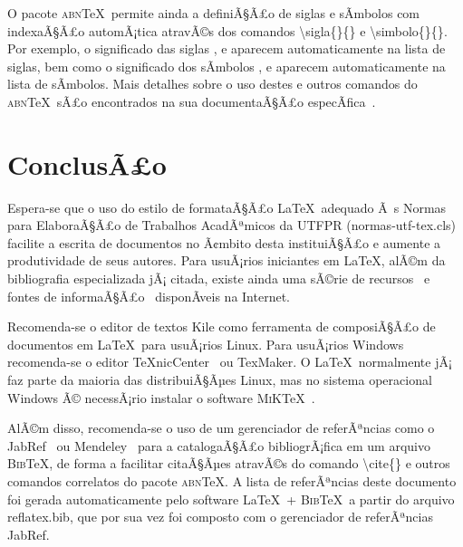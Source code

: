 \documentclass[openright]{normas-utf-tex} %
\begin{document}
O pacote \textsc{abn}\TeX\ permite ainda a definiÃ§Ã£o de siglas e sÃ­mbolos com indexaÃ§Ã£o automÃ¡tica atravÃ©s dos comandos {\ttfamily \textbackslash sigla\{\}\{\}} e {\ttfamily \textbackslash simbolo\{\}\{\}}. Por exemplo, o significado das siglas ,  e  aparecem automaticamente na lista de siglas, bem como o significado dos sÃ­mbolos ,  e  aparecem automaticamente na lista de sÃ­mbolos. Mais detalhes sobre o uso destes e outros comandos do \textsc{abn}\TeX\ sÃ£o encontrados na sua documentaÃ§Ã£o especÃ­fica~\cite{abnTeX2009}.


\chapter{ConclusÃ£o}
\label{chap:conclusao}

Espera-se que o uso do estilo de formataÃ§Ã£o \LaTeX\ adequado Ã s Normas para ElaboraÃ§Ã£o de Trabalhos AcadÃªmicos da UTFPR ({\ttfamily normas-utf-tex.cls}) facilite a escrita de documentos no Ã¢mbito desta instituiÃ§Ã£o e aumente a produtividade de seus autores. Para usuÃ¡rios iniciantes em \LaTeX, alÃ©m da bibliografia especializada jÃ¡ citada, existe ainda uma sÃ©rie de recursos~\cite{CTAN2009} e fontes de informaÃ§Ã£o~\cite{TeX-Br2009,Wikibooks2009} disponÃ­veis na Internet.

Recomenda-se o editor de textos Kile como ferramenta de composiÃ§Ã£o de documentos em \LaTeX\ para usuÃ¡rios Linux. Para usuÃ¡rios Windows recomenda-se o editor \TeX nicCenter~\cite{TeXnicCenter2009} ou TexMaker. O \LaTeX\ normalmente jÃ¡ faz parte da maioria das distribuiÃ§Ãµes Linux, mas no sistema operacional Windows Ã© necessÃ¡rio instalar o software \textsc{MiK}\TeX~\cite{MiKTeX2009}.

AlÃ©m disso, recomenda-se o uso de um gerenciador de referÃªncias como o JabRef~\cite{JabRef2009} ou Mendeley~\cite{Mendeley2009} para a catalogaÃ§Ã£o bibliogrÃ¡fica em um arquivo \textsc{Bib}\TeX, de forma a facilitar citaÃ§Ãµes atravÃ©s do comando {\ttfamily \textbackslash cite\{\}} e outros comandos correlatos do pacote \textsc{abn}\TeX. A lista de referÃªncias deste documento foi gerada automaticamente pelo software \LaTeX\ + \textsc{Bib}\TeX\ a partir do arquivo {\ttfamily reflatex.bib}, que por sua vez foi composto com o gerenciador de referÃªncias JabRef.
\end{document}
